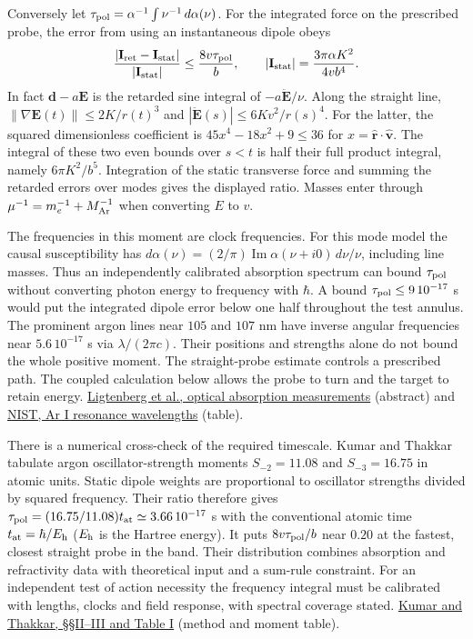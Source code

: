 \documentclass[11pt,a4paper]{article}
\begin{document}
Conversely let \(\tau_{\rm pol}=\alpha^{-1}\int\nu^{-1}\,d\alpha(\nu)\).
For the integrated force on the prescribed probe, the error from using
an instantaneous dipole obeys \[
 \frac{|\mathbf I_{\rm ret}-\mathbf I_{\rm stat}|}{|\mathbf I_{\rm stat}|}
 \le \frac{8v\tau_{\rm pol}}{b},\qquad
 |\mathbf I_{\rm stat}|=\frac{3\pi\alpha K^2}{4vb^4}.
\] In fact \(\mathbf d-a\mathbf E\) is the retarded sine integral of
\(-a\ddot{\mathbf E}/\nu\). Along the straight line,
\(\|\nabla\mathbf E(t)\|\le2K/r(t)^3\) and
\(|\ddot{\mathbf E}(s)|\le6Kv^2/r(s)^4\). For the latter, the squared
dimensionless coefficient is \(45x^4-18x^2+9\le36\) for
\(x=\hat{\mathbf r}\cdot\hat{\mathbf v}\). The integral of these two
even bounds over \(s<t\) is half their full product integral, namely
\(6\pi K^2/b^5\). Integration of the static transverse force and summing
the retarded errors over modes gives the displayed ratio. Masses enter
through \(\mu^{-1}=m_e^{-1}+M_{\rm Ar}^{-1}\) when converting \(E\) to
\(v\).

The frequencies in this moment are clock frequencies. For this mode
model the causal susceptibility has
\(d\alpha(\nu)=(2/\pi)\operatorname{Im}\alpha(\nu+i0)\,d\nu/\nu\),
including line masses. Thus an independently calibrated absorption
spectrum can bound \(\tau_{\rm pol}\) without converting photon energy
to frequency with \(\hbar\). A bound \(\tau_{\rm pol}\le9\,10^{-17}\) s
would put the integrated dipole error below one half throughout the test
annulus. The prominent argon lines near \(105\) and \(107\) nm have
inverse angular frequencies near \(5.6\,10^{-17}\) s via
\(\lambda/(2\pi c)\). Their positions and strengths alone do not bound
the whole positive moment. The straight-probe estimate controls a
prescribed path. The coupled calculation below allows the probe to turn
and the target to retain energy.
\href{https://doi.org/10.1103/PhysRevA.49.2363}{Ligtenberg et al.,
optical absorption measurements} (abstract) and
\href{https://physics.nist.gov/PhysRefData/Handbook/Tables/argontable3.htm}{NIST,
Ar I resonance wavelengths} (table).

There is a numerical cross-check of the required timescale. Kumar and
Thakkar tabulate argon oscillator-strength moments \(S_{-2}=11.08\) and
\(S_{-3}=16.75\) in atomic units. Static dipole weights are proportional
to oscillator strengths divided by squared frequency. Their ratio
therefore gives \(\tau_{\rm pol}=(16.75/11.08)t_{\rm at}\simeq
3.66\,10^{-17}\) s with the conventional atomic time
\(t_{\rm at}=\hbar/E_{\rm h}\) (\(E_{\rm h}\) is the Hartree energy). It
puts \(8v\tau_{\rm pol}/b\) near \(0.20\) at the fastest, closest
straight probe in the band. Their distribution combines absorption and
refractivity data with theoretical input and a sum-rule constraint. For
an independent test of action necessity the frequency integral must be
calibrated with lengths, clocks and field response, with spectral
coverage stated. \href{https://doi.org/10.1063/1.3315418}{Kumar and
Thakkar, §§II--III and Table I} (method and moment table).
\end{document}
